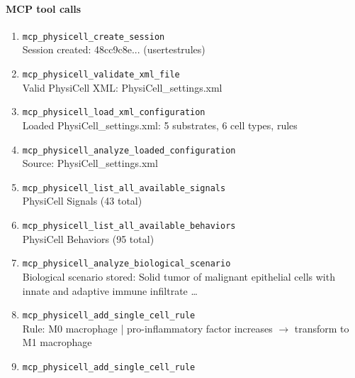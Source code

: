 \paragraph{MCP tool calls}
\begingroup
\small
\setlength{\itemsep}{5pt}
\setlength{\parskip}{0pt}
\begin{enumerate}
\item[1.] \texttt{mcp\_\allowbreak{}physicell\_\allowbreak{}create\_\allowbreak{}session}
\hfill\\
\RaggedRight Session created: 48cc9c8e... (usertestrules)
\item[2.] \texttt{mcp\_\allowbreak{}physicell\_\allowbreak{}validate\_\allowbreak{}xml\_\allowbreak{}file}
\hfill\\
\RaggedRight Valid PhysiCell XML: PhysiCell\_settings.xml
\item[3.] \texttt{mcp\_\allowbreak{}physicell\_\allowbreak{}load\_\allowbreak{}xml\_\allowbreak{}configuration}
\hfill\\
\RaggedRight Loaded PhysiCell\_settings.xml: 5 substrates, 6 cell types, rules
\item[4.] \texttt{mcp\_\allowbreak{}physicell\_\allowbreak{}analyze\_\allowbreak{}loaded\_\allowbreak{}configuration}
\hfill\\
\RaggedRight Source: PhysiCell\_settings.xml
\item[5.] \texttt{mcp\_\allowbreak{}physicell\_\allowbreak{}list\_\allowbreak{}all\_\allowbreak{}available\_\allowbreak{}signals}
\hfill\\
\RaggedRight PhysiCell Signals (43 total)
\item[6.] \texttt{mcp\_\allowbreak{}physicell\_\allowbreak{}list\_\allowbreak{}all\_\allowbreak{}available\_\allowbreak{}behaviors}
\hfill\\
\RaggedRight PhysiCell Behaviors (95 total)
\item[7.] \texttt{mcp\_\allowbreak{}physicell\_\allowbreak{}analyze\_\allowbreak{}biological\_\allowbreak{}scenario}
\hfill\\
\RaggedRight Biological scenario stored: Solid tumor of malignant epithelial cells with innate and adaptive immune infiltrate \ldots{}
\item[8.] \texttt{mcp\_\allowbreak{}physicell\_\allowbreak{}add\_\allowbreak{}single\_\allowbreak{}cell\_\allowbreak{}rule}
\hfill\\
\RaggedRight Rule: M0 macrophage | pro-inflammatory factor increases \ensuremath{\rightarrow} transform to M1 macrophage
\item[9.] \texttt{mcp\_\allowbreak{}physicell\_\allowbreak{}add\_\allowbreak{}single\_\allowbreak{}cell\_\allowbreak{}rule}

\end{enumerate}
